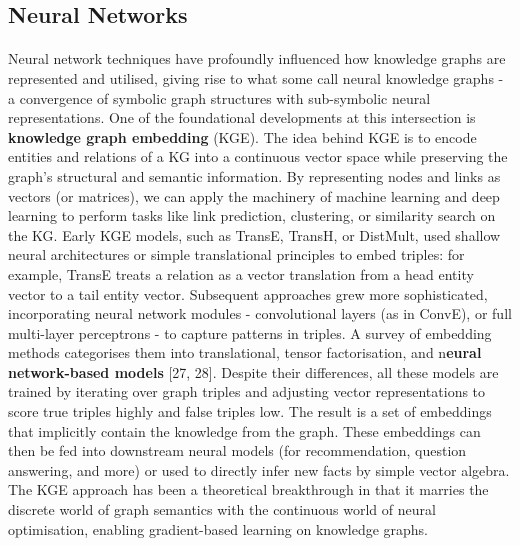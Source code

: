    \newpage
    \subsection{Neural Networks}
    
        \paragraph{} Neural network techniques have profoundly influenced how knowledge graphs are represented and utilised, giving rise to what some call neural knowledge graphs - a convergence of symbolic graph structures with sub-symbolic neural representations. One of the foundational developments at this intersection is \textbf{knowledge graph embedding} (KGE). The idea behind KGE is to encode entities and relations of a KG into a continuous vector space while preserving the graph’s structural and semantic information. By representing nodes and links as vectors (or matrices), we can apply the machinery of machine learning and deep learning to perform tasks like link prediction, clustering, or similarity search on the KG. Early KGE models, such as TransE, TransH, or DistMult, used shallow neural architectures or simple translational principles to embed triples: for example, TransE treats a relation as a vector translation from a head entity vector to a tail entity vector. Subsequent approaches grew more sophisticated, incorporating neural network modules - convolutional layers (as in ConvE), or full multi-layer perceptrons - to capture patterns in triples. A survey of embedding methods categorises them into translational, tensor factorisation, and n\textbf{eural network-based models} [27, 28]. Despite their differences, all these models are trained by iterating over graph triples and adjusting vector representations to score true triples highly and false triples low. The result is a set of embeddings that implicitly contain the knowledge from the graph. These embeddings can then be fed into downstream neural models (for recommendation, question answering, and more) or used to directly infer new facts by simple vector algebra. The KGE approach has been a theoretical breakthrough in that it marries the discrete world of graph semantics with the continuous world of neural optimisation, enabling gradient-based learning on knowledge graphs.
        
